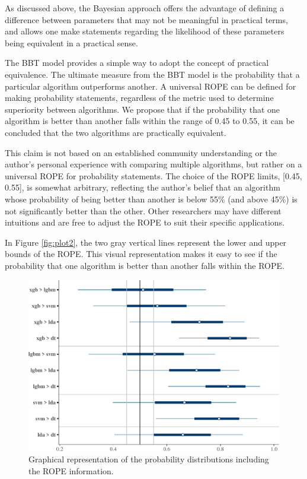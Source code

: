 \documentclass[twoside,11pt,preprint]{article}
\begin{document}
As discussed above, the Bayesian approach offers the advantage of defining a difference between parameters that may not be meaningful in practical terms, and allows one make statements regarding the likelihood of these parameters being equivalent in a practical sense.

The BBT model provides a simple way to adopt the concept of practical equivalence. The ultimate measure from the BBT model is the probability that a particular algorithm outperforms another. A universal ROPE can be defined for making probability statements, regardless of the metric used to determine superiority between algorithms. We propose that if the probability that one algorithm is better than another falls within the range of 0.45 to 0.55, it can be concluded that the two algorithms are practically equivalent.

This claim is not based on an established community understanding or the author's personal experience with comparing multiple algorithms, but rather on a universal ROPE for probability statements. The choice of the ROPE limits, {[}0.45, 0.55{]}, is somewhat arbitrary, reflecting the author's belief that an algorithm whose probability of being better than another is below 55\% (and above 45\%) is not significantly better than the other. Other researchers may have different intuitions and are free to adjust the ROPE to suit their specific applications.

In Figure \ref{fig:plot2}, the two gray vertical lines represent the lower and upper bounds of the ROPE. This visual representation makes it easy to see if the probability that one algorithm is better than another falls within the ROPE.

\begin{figure}
\includegraphics[width=0.7\linewidth]{figure-latex/xplot2-1} \caption{\label{fig:plot2}Graphical representation of the probability distributions including the ROPE information.}\label{fig:xplot2}
\end{figure}
\end{document}
